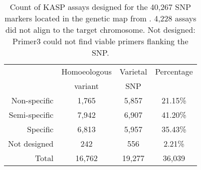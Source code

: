 
\begin{table}

\centering
\caption{Count of KASP assays designed for the 40,267 SNP markers located in the genetic map from \cite{Wang2014}. 4,228 assays did not align to the target chromosome. \label{tab:poly:designed} Not designed: Primer3 could not find viable primers flanking the SNP.}

\begin{tabular}{rccc}

\toprule
 & Homoeologous  &     Varietal  & Percentage\\
  &  variant &      SNP & \\
 \midrule
Non-specific&1,765&5,857&21.15\%\\
Semi-specific&7,942&6,907&41.20\%\\
Specific&6,813&5,957&35.43\%\\
Not designed &242&556&2.21\%\\
\midrule
 Total&16,762&19,277&36,039\\
\bottomrule
\end{tabular}

\end{table}